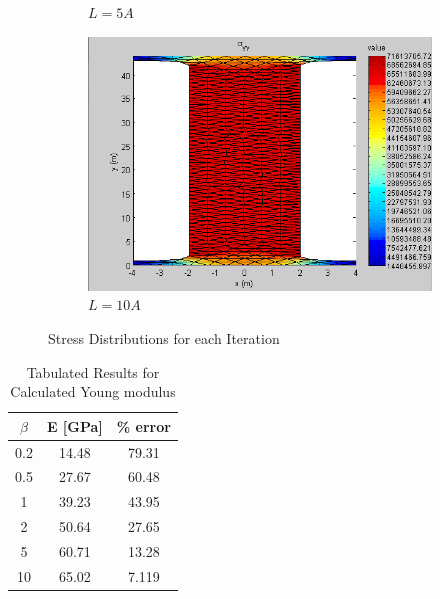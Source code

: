 \documentclass[paper=a4, fontsize=11pt]{scrartcl} %
\numberwithin{equation}{section} %
\numberwithin{figure}{section} %
\numberwithin{table}{section} %
\begin{document}
\begin{figure}[ht]
\begin{subfigure}[b]{0.45\textwidth}
		\caption{$L = 5 A$}
	\end{subfigure}
	\hfill
	\begin{subfigure}[b]{0.45\textwidth}
		\includegraphics[width=\textwidth]{stress10.png}
		\caption{$L = 10 A$}
	\end{subfigure}
	\caption{Stress Distributions for each Iteration}
\end{figure}

\begin{table}[t]
\centering
	\begin{tabular}{c c c}
		 $\beta$ & E [GPa] & \% error \\
		 \hline
		 0.2 & 14.48 & 79.31 \\
		 0.5 & 27.67 & 60.48\\
		 1 & 39.23 & 43.95\\
		 2 & 50.64 & 27.65\\
		 5 & 60.71 & 13.28\\
		 10 & 65.02 & 7.119\\
		\hline
	\end{tabular}
\caption{Tabulated Results for Calculated Young modulus}
\label{tab:q2table1}
\end{table}
\end{document}
